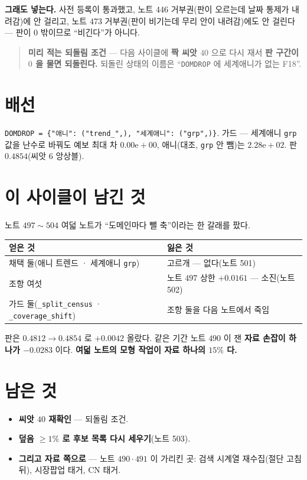 \documentclass[11pt]{article}
\begin{document}
\textbf{그래도 넣는다.} 사전 등록이 통과했고, 노트 446 거부권(판이 오르는데
날짜 통제가 내려감)에 안 걸리고, 노트 473 거부권(판이 비기는데 무리 안이
내려감)에도 안 걸린다 --- 판이 $0$ 밖이므로 ``비긴다''가 아니다.

\begin{quote}
\textbf{미리 적는 되돌림 조건} --- 다음 사이클에 \textbf{짝 씨앗 $40$}
으로 다시 재서 \textbf{판 구간이 $0$ 을 물면 되돌린다.} 되돌린 상태의
이름은 ``\texttt{DOMDROP} 에 세계애니가 없는 F18''.
\end{quote}

\section{배선}

\texttt{DOMDROP = \{"애니": ("trend\_",), "세계애니": ("grp",)\}}. 가드 ---
세계애니 \texttt{grp} 값을 난수로 바꿔도 예보 최대 차
$0.00\mathrm{e}{+}00$, 애니(대조, \texttt{grp} 안 뺌)는
$2.28\mathrm{e}{+}02$. 판 $0.4854$(씨앗 $6$ 앙상블).

\section{이 사이클이 남긴 것}

노트 $497 \sim 504$ 여덟 노트가 ``도메인마다 뺄 축''이라는 한 갈래를 팠다.

\begin{center}
\begin{tabular}{ll}
\hline
얻은 것 & 잃은 것 \\
\hline
채택 둘(애니 트렌드 · 세계애니 \texttt{grp}) & 고르개 --- 없다(노트 501) \\
조항 여섯 & 노트 $497$ 상한 $+0.0161$ --- 소진(노트 502) \\
가드 둘(\texttt{\_split\_census} · \texttt{\_coverage\_shift}) & 조항 둘을 다음 노트에서 죽임 \\
\hline
\end{tabular}
\end{center}

판은 $0.4812 \to \mathbf{0.4854}$ 로 $+0.0042$ 올랐다. 같은 기간 노트
$490$ 이 잰 \textbf{자료 손잡이 하나가 $-0.0283$} 이다. \textbf{여덟
노트의 모형 작업이 자료 하나의 $15\%$ 다.}

\section*{남은 것}

\begin{itemize}
\item \textbf{씨앗 $40$ 재확인} --- 되돌림 조건.
\item \textbf{덮음 $\geq 1\%$ 로 후보 목록 다시 세우기}(노트 503).
\item \textbf{그리고 자료 쪽으로} --- 노트 $490 \cdot 491$ 이 가리킨 곳:
검색 시계열 재수집(절단 고침 뒤), 시장팝업 태거, CN 태거.
\end{itemize}
\end{document}
